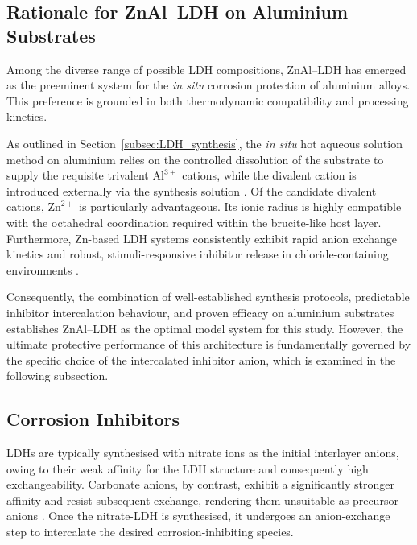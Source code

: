 \documentclass[11pt,twoside,a4paper,final]{report}
\begin{document}
\subsection{Rationale for ZnAl--LDH on Aluminium Substrates}
\label{subsec:ZnAl}

Among the diverse range of possible LDH compositions, ZnAl--LDH has emerged as the preeminent system for the \textit{in situ} corrosion protection of aluminium alloys. This preference is grounded in both thermodynamic compatibility and processing kinetics. 

As outlined in Section~\ref{subsec:LDH_synthesis}, the \textit{in situ} hot aqueous solution method on aluminium relies on the controlled dissolution of the substrate to supply the requisite trivalent $\mathrm{Al}^{3+}$ cations, while the divalent cation is introduced externally via the synthesis solution \cite{BoualiReview2020, Cao2022}. Of the candidate divalent cations, $\mathrm{Zn}^{2+}$ is particularly advantageous. Its ionic radius is highly compatible with the octahedral coordination required within the brucite-like host layer. Furthermore, Zn-based LDH systems consistently exhibit rapid anion exchange kinetics and robust, stimuli-responsive inhibitor release in chloride-containing environments \cite{Bouali2020, Tedim2011, BoualiReview2020, Cao2022}.

Consequently, the combination of well-established synthesis protocols, predictable inhibitor intercalation behaviour, and proven efficacy on aluminium substrates establishes ZnAl--LDH as the optimal model system for this study. However, the ultimate protective performance of this architecture is fundamentally governed by the specific choice of the intercalated inhibitor anion, which is examined in the following subsection.

\subsection{Corrosion Inhibitors}
\label{subsec:inhibitors}

LDHs are typically synthesised with nitrate ions as the initial interlayer anions, owing to their weak affinity for the LDH structure and consequently high exchangeability. Carbonate anions, by contrast, exhibit a significantly stronger affinity and resist subsequent exchange, rendering them unsuitable as precursor anions \cite{Cao2022}. Once the nitrate-LDH is synthesised, it undergoes an anion-exchange step to intercalate the desired corrosion-inhibiting species. 
\end{document}
